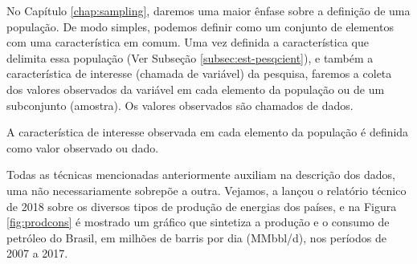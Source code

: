 \documentclass[
]{book}
\begin{document}
No Capítulo \ref{chap:sampling}, daremos uma maior ênfase sobre a definição de uma população. De modo simples, podemos definir como um conjunto de elementos com uma característica em comum. Uma vez definida a característica que delimita essa população (Ver Subseção \ref{subsec:est-pesqcient}), e também a característica de interesse (chamada de variável) da pesquisa, faremos a coleta dos valores observados da variável em cada elemento da população ou de um subconjunto (amostra). Os valores observados são chamados de dados.

\leavevmode\hypertarget{def:dado}{}%
A característica de interesse observada em cada elemento da população é definida como valor observado ou dado.

Todas as técnicas mencionadas anteriormente auxiliam na descrição dos dados, uma não necessariamente sobrepõe a outra. Vejamos, a \citet{BP2018} lançou o relatório técnico de 2018 sobre os diversos tipos de produção de energias dos países, e na Figura \ref{fig:prodcons} é mostrado um gráfico que sintetiza a produção e o consumo de petróleo do Brasil, em milhões de barris por dia (MMbbl/d), nos períodos de 2007 a 2017.
\end{document}
